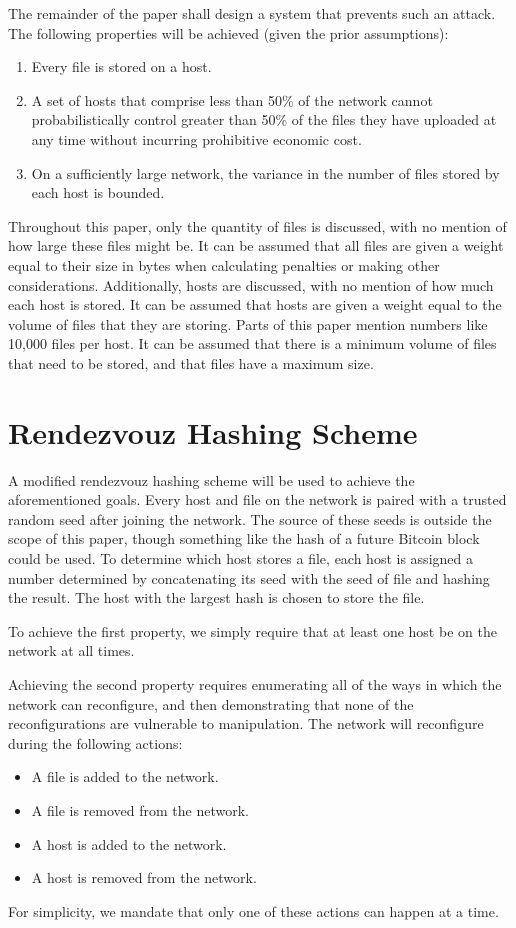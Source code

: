 \documentclass[twocolumn]{article}
\begin{document}
The remainder of the paper shall design a system that prevents such an attack. The following properties will be achieved (given the prior assumptions):
\begin{enumerate}
	\item Every file is stored on a host.
	\item A set of hosts that comprise less than 50\% of the network cannot probabilistically control greater than 50\% of the files they have uploaded at any time without incurring prohibitive economic cost.
	\item On a sufficiently large network, the variance in the number of files stored by each host is bounded.
\end{enumerate}

Throughout this paper, only the quantity of files is discussed, with no mention of how large these files might be.
It can be assumed that all files are given a weight equal to their size in bytes when calculating penalties or making other considerations.
Additionally, hosts are discussed, with no mention of how much each host is stored.
It can be assumed that hosts are given a weight equal to the volume of files that they are storing.
Parts of this paper mention numbers like 10,000 files per host.
It can be assumed that there is a minimum volume of files that need to be stored, and that files have a maximum size.

\section{Rendezvouz Hashing Scheme}
A modified rendezvouz hashing scheme will be used to achieve the aforementioned goals.
Every host and file on the network is paired with a trusted random seed after joining the network.
The source of these seeds is outside the scope of this paper, though something like the hash of a future Bitcoin block could be used.
To determine which host stores a file, each host is assigned a number determined by concatenating its seed with the seed of file and hashing the result.
The host with the largest hash is chosen to store the file.

To achieve the first property, we simply require that at least one host be on the network at all times.

Achieving the second property requires enumerating all of the ways in which the network can reconfigure, and then demonstrating that none of the reconfigurations are vulnerable to manipulation.
The network will reconfigure during the following actions:
\begin{itemize}
	\item A file is added to the network.
	\item A file is removed from the network.
	\item A host is added to the network.
	\item A host is removed from the network.
\end{itemize}
For simplicity, we mandate that only one of these actions can happen at a time.
\end{document}
